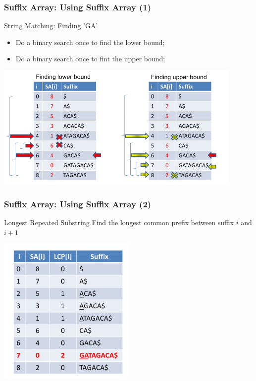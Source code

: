 \documentclass{beamer}
\begin{document}
\begin{frame}
  \frametitle{Suffix Array: Using Suffix Array (1)}
  {\smaller
    \begin{block}{String Matching: Finding 'GA'}
      \begin{itemize}
      \item Do a binary search once to find the lower bound;
      \item Do a binary search once to fint the upper bound;
      \end{itemize}
    \end{block}
    \begin{center}
      \includegraphics[width=0.9\textwidth]{../img/suffixarray_halim}
    \end{center}
  }
\end{frame}

\begin{frame}
    \frametitle{Suffix Array: Using Suffix Array (2)}
  {\smaller
    \begin{block}{Longest Repeated Substring}
      Find the longest common prefix between suffix $i$ and $i+1$
    \end{block}
    \begin{center}
      \includegraphics[width=0.5\textwidth]{../img/suffixarray2_halim}
    \end{center}
  }
\end{frame}
\end{document}
